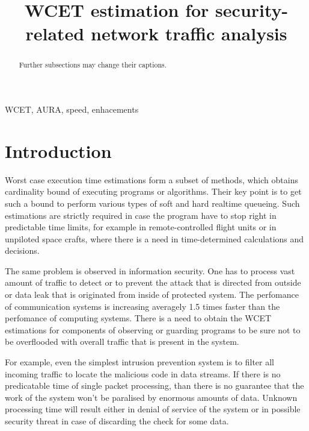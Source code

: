 \documentclass[10pt, conference, compsocconf]{IEEEtran}
\begin{document}
\title{WCET estimation for security-related
network traffic analysis}

\author{
}


\maketitle
\begin{abstract}
Further subsections may change their captions.
\end{abstract}

\begin{IEEEkeywords}
WCET, AURA, speed, enhacements
\end{IEEEkeywords}

\section{Introduction}
Worst case execution time estimations form a subset of methods,
which obtains cardinality bound of executing programs or algorithms. 
Their key point is to get such a bound to perform various types of soft and hard realtime queueing.
Such estimations are strictly required in case the program have to stop right in predictable time limits,
for example in remote-controlled flight units or in unpiloted space crafts, 
where there is a need in time-determined calculations and decisions.

The same problem is observed in information security.
One has to process vast amount of traffic to detect or to prevent the attack that is directed from outside or data leak that is originated from inside of protected system.
The perfomance of communication systems is increasing averagely 1.5 times faster than the perfomance of computing systems.
There is a need to obtain the WCET estimations for components of observing or guarding programs to be sure not to be overflooded with overall traffic that is present in the system.

For example, even the simplest intrusion prevention system is to filter all incoming traffic to locate the malicious code in data streams.
If there is no predicatable time of single packet processing, than there is no guarantee that the work of the system won't be paralised by enormous amounts of data.
Unknown processing time will result either in denial of service of the system or in possible security threat in case of discarding the check for some data.
\end{document}
